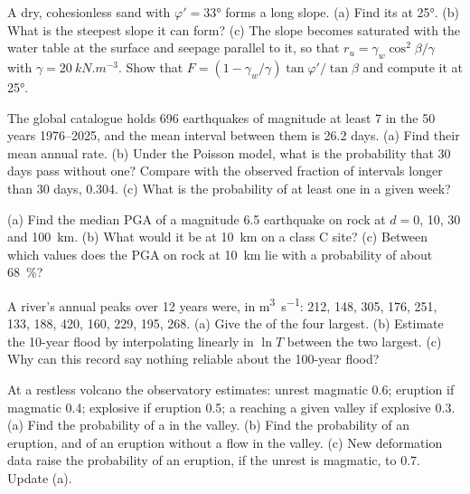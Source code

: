 \begin{exercise}[$\star$]\label{exo:b2:geological-hazards:4}
A dry, cohesionless sand with $\varphi' = \ang{33}$ forms a long slope. (a) Find its  at \ang{25}. (b) What is the steepest slope it can form? (c) The slope becomes saturated with
the water table at the surface and seepage parallel to it, so that $r_u = \gamma_w\cos^2\beta/\gamma$
with $\gamma = \qty{20}{kN.m^{-3}}$. Show that $F = (1 - \gamma_w/\gamma)\tan\varphi'/\tan\beta$ and
compute it at \ang{25}.
\end{exercise}

\begin{exercise}[$\star\star$]\label{exo:b2:geological-hazards:5}
The global catalogue holds 696 earthquakes of magnitude at least 7 in the 50 years 1976--2025, and
the mean interval between them is 26.2 days. (a) Find their mean annual rate. (b) Under the
Poisson model, what is the probability that 30 days pass without one? Compare with the observed
fraction of intervals longer than 30 days, 0.304. (c) What is the probability of at least one in a
given week?
\end{exercise}

\begin{exercise}[$\star\star$]\label{exo:b2:geological-hazards:6}
(a) Find the median PGA of a magnitude 6.5 earthquake on rock at $d = 0$, 10, 30 and
\qty{100}{km}. (b) What would it be at \qty{10}{km} on a class C site? (c) Between which values
does the PGA on rock at \qty{10}{km} lie with a probability of about \qty{68}{\percent}?
\end{exercise}

\begin{exercise}[$\star\star$]\label{exo:b2:geological-hazards:7}
A river's annual peaks over 12 years were, in \unit{m^3.s^{-1}}: 212, 148, 305, 176, 251, 133, 188,
420, 160, 229, 195, 268. (a) Give the  of the four largest. (b) Estimate the 10-year
flood by interpolating linearly in $\ln T$ between the two largest. (c) Why can this record say
nothing reliable about the 100-year flood?
\end{exercise}

\begin{exercise}[$\star\star$]\label{exo:b2:geological-hazards:8}
At a restless volcano the observatory estimates: unrest magmatic 0.6; eruption if magmatic 0.4;
explosive if eruption 0.5; a  reaching a given valley if explosive 0.3. (a) Find
the probability of a  in the valley. (b) Find the probability of an eruption, and
of an eruption without a flow in the valley. (c) New deformation data raise the probability of an
eruption, if the unrest is magmatic, to 0.7. Update (a).
\end{exercise}

